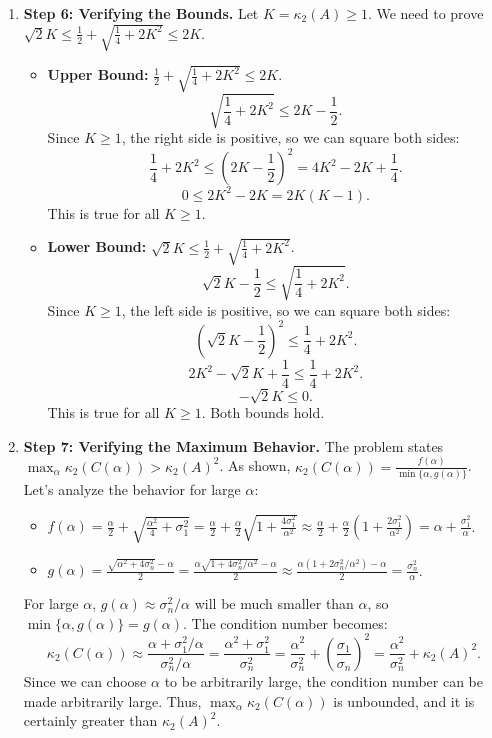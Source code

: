 \begin{solution}
\begin{enumerate}
    \item \textbf{Step 6: Verifying the Bounds.}
    Let $K = \kappa_2(A) \ge 1$. We need to prove $\sqrt{2}K \le \frac{1}{2} + \sqrt{\frac{1}{4} + 2K^2} \le 2K$.
    \begin{itemize}
        \item \textbf{Upper Bound:} $\frac{1}{2} + \sqrt{\frac{1}{4} + 2K^2} \le 2K$.
        \[ \sqrt{\frac{1}{4} + 2K^2} \le 2K - \frac{1}{2}. \]
        Since $K \ge 1$, the right side is positive, so we can square both sides:
        \[ \frac{1}{4} + 2K^2 \le \left(2K - \frac{1}{2}\right)^2 = 4K^2 - 2K + \frac{1}{4}. \]
        \[ 0 \le 2K^2 - 2K = 2K(K-1). \]
        This is true for all $K \ge 1$.
        \item \textbf{Lower Bound:} $\sqrt{2}K \le \frac{1}{2} + \sqrt{\frac{1}{4} + 2K^2}$.
        \[ \sqrt{2}K - \frac{1}{2} \le \sqrt{\frac{1}{4} + 2K^2}. \]
        Since $K \ge 1$, the left side is positive, so we can square both sides:
        \[ (\sqrt{2}K - \frac{1}{2})^2 \le \frac{1}{4} + 2K^2. \]
        \[ 2K^2 - \sqrt{2}K + \frac{1}{4} \le \frac{1}{4} + 2K^2. \]
        \[ -\sqrt{2}K \le 0. \]
        This is true for all $K \ge 1$. Both bounds hold.
    \end{itemize}

    \item \textbf{Step 7: Verifying the Maximum Behavior.}
    The problem states $\max_{\alpha}\kappa_{2}(C(\alpha))>\kappa_{2}(A)^{2}$.
    As shown, $\kappa_2(C(\alpha)) = \frac{f(\alpha)}{\min\{\alpha, g(\alpha)\}}$.
    Let's analyze the behavior for large $\alpha$:
    \begin{itemize}
        \item $f(\alpha) = \frac{\alpha}{2} + \sqrt{\frac{\alpha^2}{4} + \sigma_1^2} = \frac{\alpha}{2} + \frac{\alpha}{2}\sqrt{1 + \frac{4\sigma_1^2}{\alpha^2}} \approx \frac{\alpha}{2} + \frac{\alpha}{2}\left(1 + \frac{2\sigma_1^2}{\alpha^2}\right) = \alpha + \frac{\sigma_1^2}{\alpha}$.
        \item $g(\alpha) = \frac{\sqrt{\alpha^2 + 4\sigma_n^2} - \alpha}{2} = \frac{\alpha\sqrt{1 + 4\sigma_n^2/\alpha^2} - \alpha}{2} \approx \frac{\alpha(1 + 2\sigma_n^2/\alpha^2) - \alpha}{2} = \frac{\sigma_n^2}{\alpha}$.
    \end{itemize}
    For large $\alpha$, $g(\alpha) \approx \sigma_n^2/\alpha$ will be much smaller than $\alpha$, so $\min\{\alpha, g(\alpha)\} = g(\alpha)$.
    The condition number becomes:
    \[ \kappa_2(C(\alpha)) \approx \frac{\alpha + \sigma_1^2/\alpha}{\sigma_n^2/\alpha} = \frac{\alpha^2 + \sigma_1^2}{\sigma_n^2} = \frac{\alpha^2}{\sigma_n^2} + \left(\frac{\sigma_1}{\sigma_n}\right)^2 = \frac{\alpha^2}{\sigma_n^2} + \kappa_2(A)^2. \]
    Since we can choose $\alpha$ to be arbitrarily large, the condition number can be made arbitrarily large. Thus, $\max_{\alpha} \kappa_2(C(\alpha))$ is unbounded, and it is certainly greater than $\kappa_2(A)^2$.
\end{enumerate}
\end{solution}

